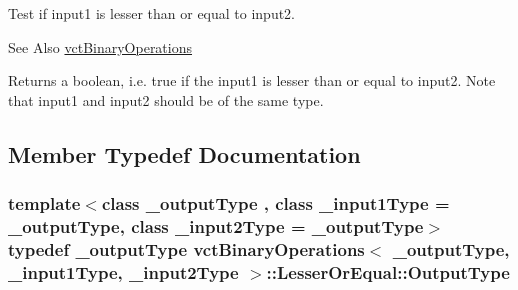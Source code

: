 Test if input1 is lesser than or equal to input2. 

\begin{DoxySeeAlso}{See Also}
\hyperlink{classvct_binary_operations}{vct\-Binary\-Operations}
\end{DoxySeeAlso}
Returns a boolean, i.\-e. true if the input1 is lesser than or equal to input2. Note that input1 and input2 should be of the same type. 

\subsection{Member Typedef Documentation}
\hypertarget{classvct_binary_operations_1_1_lesser_or_equal_adff9c45eb56546ff372f5b7a614bb271}{
\subsubsection[{Output\-Type}]{\setlength{\rightskip}{0pt plus 5cm}template$<$class \-\_\-output\-Type , class \-\_\-input1\-Type  = \-\_\-output\-Type, class \-\_\-input2\-Type  = \-\_\-output\-Type$>$ typedef \-\_\-output\-Type {\bf vct\-Binary\-Operations}$<$ \-\_\-output\-Type, \-\_\-input1\-Type, \-\_\-input2\-Type $>$\-::{\bf Lesser\-Or\-Equal\-::\-Output\-Type}}}\label{classvct_binary_operations_1_1_lesser_or_equal_adff9c45eb56546ff372f5b7a614bb271}


